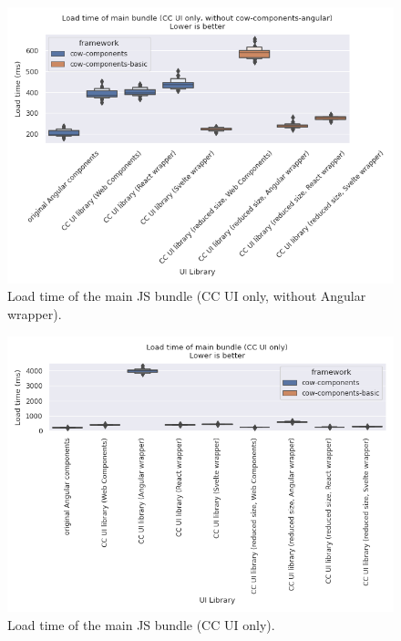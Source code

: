 \begin{figure}[h]
  \includegraphics[width=\columnwidth]{plots/load-time-cow-no-angular.png}
  \caption{Load time of the main JS bundle (CC UI only, without Angular wrapper).}
  \label{fig:results:load-time-cow-no-angular}
  \centering
\end{figure}

\begin{figure}[h]
  \includegraphics[width=\columnwidth]{plots/load-time-cow.png}
  \caption{Load time of the main JS bundle (CC UI only).}
  \label{fig:results:load-time-cow}
  \centering
\end{figure}

